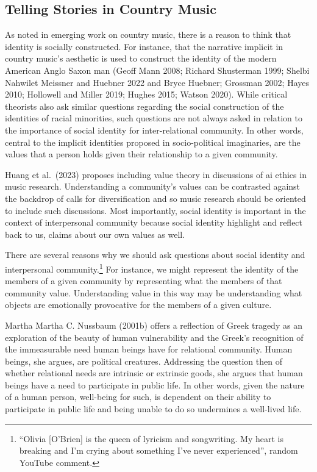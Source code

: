 \documentclass[
  letterpaper,
  DIV=11,
  numbers=noendperiod]{scrartcl}
\theoremstyle{remark}
\begin{document}
\subsection{Telling Stories in Country
Music}\label{telling-stories-in-country-music}

As noted in emerging work on country music, there is a reason to think
that identity is socially constructed. For instance, that the narrative
implicit in country music's aesthetic is used to construct the identity
of the modern American Anglo Saxon man (Geoff Mann 2008; Richard
Shusterman 1999; Shelbi Nahwilet Meissner and Huebner 2022 and Bryce
Huebner; Grossman 2002; Hayes 2010; Hollowell and Miller 2019; Hughes
2015; Watson 2020). While critical theorists also ask similar questions
regarding the social construction of the identities of racial
minorities, such questions are not always asked in relation to the
importance of social identity for inter-relational community. In other
words, central to the implicit identities proposed in socio-political
imaginaries, are the values that a person holds given their relationship
to a given community.

Huang et al.~(2023) proposes including value theory in discussions of ai
ethics in music research. Understanding a community's values can be
contrasted against the backdrop of calls for diversification and so
music research should be oriented to include such discussions. Most
importantly, social identity is important in the context of
interpersonal community because social identity highlight and reflect
back to us, claims about our own values as well.

There are several reasons why we should ask questions about social
identity and interpersonal community.\footnote{``Olivia {[}O'Brien{]} is
  the queen of lyricism and songwriting. My heart is breaking and I'm
  crying about something I've never experienced'', random YouTube
  comment.} For instance, we might represent the identity of the members
of a given community by representing what the members of that community
value. Understanding value in this way may be understanding what objects
are emotionally provocative for the members of a given culture.

Martha Martha C. Nussbaum (2001b) offers a reflection of Greek tragedy
as an exploration of the beauty of human vulnerability and the Greek's
recognition of the immeasurable need human beings have for relational
community. Human beings, she argues, are political creatures. Addressing
the question then of whether relational needs are intrinsic or extrinsic
goods, she argues that human beings have a need to participate in public
life. In other words, given the nature of a human person, well-being for
such, is dependent on their ability to participate in public life and
being unable to do so undermines a well-lived life.
\end{document}
